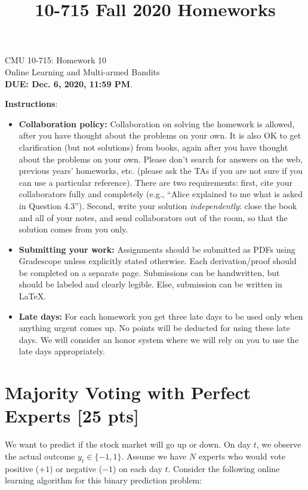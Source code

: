 \documentclass{article}
\title{10-715 Fall 2020 Homeworks}
\begin{document}

\begin{center}
{\Large CMU 10-715: Homework 10}\\
Online Learning and Multi-armed Bandits \\
{\bf DUE: Dec. 6, 2020, 11:59 PM}.\\
\end{center}


\textbf{\large Instructions}:
\begin{itemize}
    \item \textbf{Collaboration policy:} Collaboration on solving the homework is allowed, after you have thought about the problems on your own. It is also OK to get clarification (but not solutions) from books, again after you have thought about the problems on your own. Please don’t search for answers on the web, previous years’ homeworks, etc. (please ask the TAs if you are not sure if you can use a particular reference). There are two requirements: first, cite your collaborators fully and completely (e.g., ``Alice explained to me what is asked in Question 4.3''). Second, write your solution \emph{independently}: close the book and all of your notes, and send collaborators out of the room, so that the solution comes from you only. 
    \item \textbf{Submitting your work:} Assignments should be submitted as PDFs using Gradescope unless explicitly stated otherwise. Each derivation/proof should be completed on a separate page. Submissions can be handwritten, but should be labeled and clearly legible. Else, submission can be written in LaTeX.
    
    \item \textbf{Late days:} For each homework you get three late days to be used only when anything urgent comes up. No points will be deducted for using these late days. We will consider an honor system where we will rely on you to use the late days appropriately.
    

\end{itemize}
\newpage
\section{Majority Voting with Perfect Experts    [25 pts]} 
We want to predict if the stock market will go up or down. On day $t$, we observe the actual outcome $y_t\in \{ -1, 1\}$. Assume we have $N$ experts who would vote positive ($+1$) or negative ($-1$) on each day $t$. 
Consider the following online learning algorithm for this binary prediction problem:
\vspace{5mm}
\end{document}
